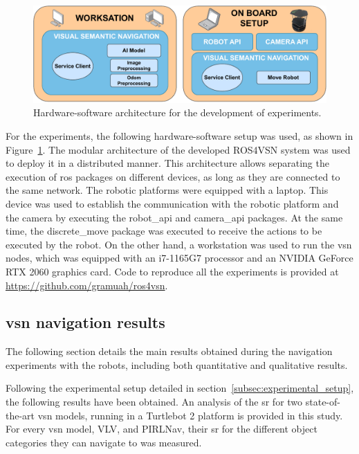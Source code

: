 \begin{figure}
    \centering
        \includegraphics[width=\linewidth]{figures/ros4vsn/hw-sw-scheme}
        \caption{Hardware-software architecture for the development of experiments.}
        \label{fig:setup_experiment}
\end{figure}

For the experiments, the following hardware-software setup was used, as shown in Figure~\ref{fig:setup_experiment}.
The modular architecture of the developed ROS4VSN system was used to deploy it in a distributed manner.
This architecture allows separating the execution of \acrshort{ros} packages on different devices, as long as they are connected to the same network.
The robotic platforms were equipped with a laptop.
This device was used to establish the communication with the robotic platform and the camera by executing the robot\_api and camera\_api packages.
At the same time, the discrete\_move package was executed to receive the actions to be executed by the robot.
On the other hand, a workstation was used to run the \acrshort{vsn} nodes, which was equipped with an i7-1165G7 processor and an NVIDIA GeForce RTX 2060 graphics card.
Code to reproduce all the experiments is provided at \url{https://github.com/gramuah/ros4vsn}.


\subsection{\acrshort{vsn} navigation results}
\label{subsec:vsn}
The following section details the main results obtained during the navigation experiments with the robots, including both quantitative and qualitative results.

Following the experimental setup detailed in section~\ref{subsec:experimental_setup}, the following results have been obtained.
An analysis of the \acrshort{sr} for two state-of-the-art \acrshort{vsn} models, running in a Turtlebot 2 platform is provided in this study.
For every \acrshort{vsn} model, \ie VLV, and PIRLNav, their \acrshort{sr} for the different object categories they can navigate to was measured.

